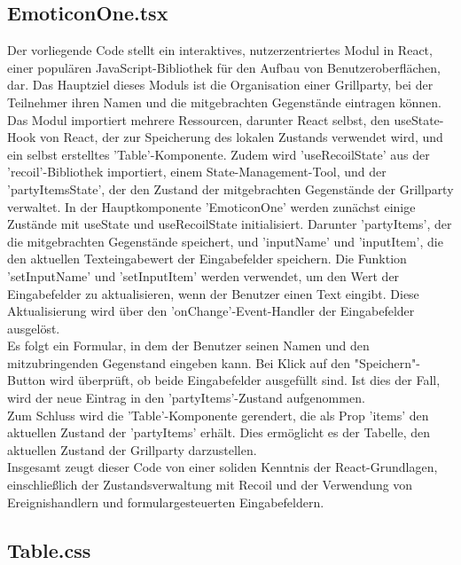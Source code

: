 \documentclass[./dokumentation.tex]{subfiles}
\begin{document}
\subsection{EmoticonOne.tsx}

Der vorliegende Code stellt ein interaktives, nutzerzentriertes Modul in React, einer populären JavaScript-Bibliothek für den Aufbau von Benutzeroberflächen, dar. Das Hauptziel dieses Moduls ist die Organisation einer Grillparty, bei der Teilnehmer ihren Namen und die mitgebrachten Gegenstände eintragen können. \\
Das Modul importiert mehrere Ressourcen, darunter React selbst, den useState-Hook von React, der zur Speicherung des lokalen Zustands verwendet wird, und ein selbst erstelltes 'Table'-Komponente. Zudem wird 'useRecoilState' aus der 'recoil'-Bibliothek importiert, einem State-Management-Tool, und der 'partyItemsState', der den Zustand der mitgebrachten Gegenstände der Grillparty verwaltet.
In der Hauptkomponente 'EmoticonOne' werden zunächst einige Zustände mit useState und useRecoilState initialisiert. Darunter 'partyItems', der die mitgebrachten Gegenstände speichert, und 'inputName' und 'inputItem', die den aktuellen Texteingabewert der Eingabefelder speichern.
Die Funktion 'setInputName' und 'setInputItem' werden verwendet, um den Wert der Eingabefelder zu aktualisieren, wenn der Benutzer einen Text eingibt. Diese Aktualisierung wird über den 'onChange'-Event-Handler der Eingabefelder ausgelöst.\\
Es folgt ein Formular, in dem der Benutzer seinen Namen und den mitzubringenden Gegenstand eingeben kann. Bei Klick auf den "Speichern"-Button wird überprüft, ob beide Eingabefelder ausgefüllt sind. Ist dies der Fall, wird der neue Eintrag in den 'partyItems'-Zustand aufgenommen.\\
Zum Schluss wird die 'Table'-Komponente gerendert, die als Prop 'items' den aktuellen Zustand der 'partyItems' erhält. Dies ermöglicht es der Tabelle, den aktuellen Zustand der Grillparty darzustellen.\\
Insgesamt zeugt dieser Code von einer soliden Kenntnis der React-Grundlagen, einschließlich der Zustandsverwaltung mit Recoil und der Verwendung von Ereignishandlern und formulargesteuerten Eingabefeldern.

\subsection{Table.css}
\end{document}

